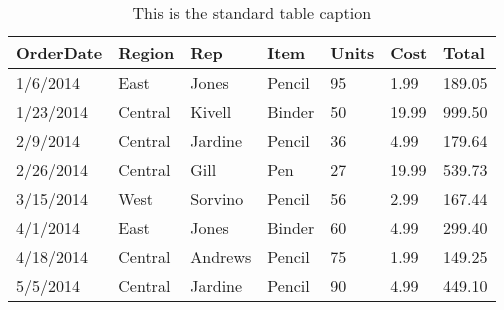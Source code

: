 \begin{table}[tb]
  \centering
  \caption{This is the standard table caption}
  \begin{tabular}{l l l l l l l}
    \toprule
    OrderDate & Region & Rep & Item & Units & Cost & Total \\
    \midrule
    1/6/2014 & East & Jones & Pencil & 95 & 1.99 & 189.05 \\
    1/23/2014 & Central & Kivell & Binder & 50 & 19.99 & 999.50 \\
    2/9/2014 & Central & Jardine & Pencil & 36 & 4.99 & 179.64 \\
    2/26/2014 & Central & Gill & Pen & 27 & 19.99 & 539.73 \\
    3/15/2014 & West & Sorvino & Pencil & 56 & 2.99 & 167.44 \\
    4/1/2014 & East & Jones & Binder & 60 & 4.99 & 299.40 \\
    4/18/2014 & Central & Andrews & Pencil & 75 & 1.99 & 149.25 \\
    5/5/2014 & Central & Jardine & Pencil & 90 & 4.99 & 449.10 \\
    \bottomrule
  \end{tabular}
  \label{tab:1}
\end{table}
%
\blindtext



